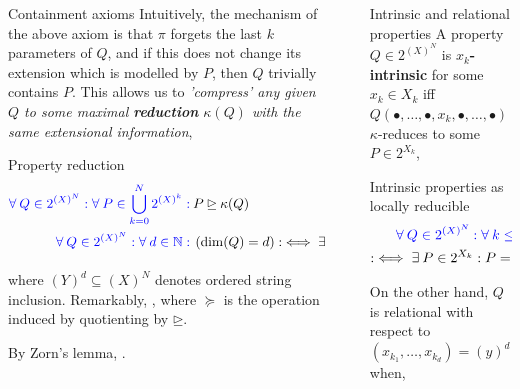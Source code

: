 \documentclass[final]{beamer}
\newlength{\sepwidth}
\newlength{\colwidth}
\newcommand{\separatorcolumn}{\begin{column}{\sepwidth}\end{column}}
\newcommand{\fa}{\forall \:}
\newcommand{\mc}{\mathcal}
\theoremstyle{remark}
\begin{document}
\begin{frame}[t]
\begin{columns}[t]
\begin{column}{\colwidth}
\begin{block}{Containment axioms}
Intuitively, the mechanism of the above axiom is that $\pi$ forgets the last $k$ parameters of $Q$, and if this does not change its extension which is modelled by $P$, then $Q$ trivially contains $P$. This allows us to \emph{'compress' any given $Q$ to some maximal \textbf{reduction} $\kappa(Q)$ with the same extensional information},

\begin{alertblock}{Property reduction}
\begin{align*}
\qua{\fa Q \in 2^{(X)^N} : \fa P \in \bigcup\limits_{k=0}^{N} 2^{(X)^k} :} & P \unrhd \kappa(Q) \\
\qua{\fa Q \in 2^{(X)^N} : \fa d \in \N :} & \p{\dim(Q) = d} : \iff \exi (Y)^d \subseteq (X)^N : \p{\kappa(Q) \in 2^{(Y)^d}}
\end{align*}
\end{alertblock}
\end{block}

where $(Y)^d \subseteq (X)^N$ denotes ordered string inclusion. Remarkably, , where $\succeq$ is the operation induced by quotienting by $\unrhd$. 

\newline

By Zorn's lemma, .

\end{column}

\separatorcolumn

\begin{column}{\colwidth}

\begin{block}{Intrinsic and relational properties}
A property $Q \in 2^{(X)^N}$ is \textbf{$x_k$-intrinsic} for some $x_k \in X_k$ iff $Q(\bullet, \dots, \bullet, x_k, \bullet, \dots, \bullet)$ $\kappa$-reduces to some $P \in 2^{X_k}$,

\begin{alertblock}{Intrinsic properties as locally reducible}
\begin{align*}
\qua{\fa Q \in 2^{(X)^N}} & \qua{: \fa k \leq N : \fa x_k \in X_k} : Q \in \mc{I}_k(x_k) \\ 
: \iff \exi P \in 2^{X_k} & : P = \kappa(Q(\bullet, \dots, \bullet, x_k, \bullet, \dots, \bullet))
\end{align*}
\end{alertblock}

On the other hand, $Q$ is relational with respect to $(x_{k_1}, \dots, x_{k_d}) = (y)^d \in (Y)^d \subseteq (X)^N$ when,


\end{block}
\end{column}
\end{columns}
\end{frame}
\end{document}
